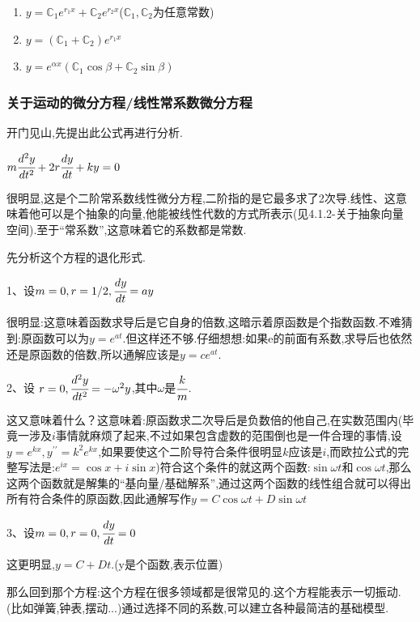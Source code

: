 \documentclass[UTF8,12pt]{ctexbook}
\newcommand{\doubleDerivative}{^{\prime\prime}}
\newcommand{\mathConstant}{\mathbb{C}}
\begin{document}
{{{{\begin{enumerate}
{          \begin{enumerate}
            \item $y = \mathConstant_1e^{r_1x} + \mathConstant_2e^{r_2x}$($\mathConstant_1,\mathConstant_2$为任意常数)
            \item $y = (\mathConstant_1 + \mathConstant_2)e^{r_1x}$
            \item $y = e^{\alpha x}(\mathConstant_1\cos\beta + \mathConstant_2\sin\beta)$
          \end{enumerate}
          }
  \end{enumerate}

}%

\subsubsection{关于运动的微分方程/线性常系数微分方程}{
开门见山,先提出此公式再进行分析.

$m\cfrac{d^2y}{dt^2} + 2r\cfrac{dy}{dt} + ky = 0$

很明显,这是个二阶常系数线性微分方程,二阶指的是它最多求了2次导.线性、这意味着他可以是个抽象的向量,他能被线性代数的方式所表示(见4.1.2-关于抽象向量空间).至于“常系数”,这意味着它的系数都是常数.

先分析这个方程的退化形式.

1、设$m = 0, r = 1/2, \cfrac{dy}{dt} = ay$

很明显:这意味着函数求导后是它自身的倍数,这暗示着原函数是个指数函数.不难猜到:原函数可以为$y = e^{at}$.但这样还不够.仔细想想:如果e的前面有系数,求导后也依然还是原函数的倍数,所以通解应该是$y = ce^{at}$.

2、设 $r = 0, \cfrac{d^2y}{dt^2} = -\omega^2y$,其中$\omega$是$\cfrac{k}{m}$.

这又意味着什么？这意味着:原函数求二次导后是负数倍的他自己,在实数范围内(毕竟一涉及$i$事情就麻烦了起来,不过如果包含虚数的范围倒也是一件合理的事情,设$y=e^{kx},y\doubleDerivative = k^{2}e^{kx}$,如果要使这个二阶导符合条件很明显$k$应该是$i$,而欧拉公式的完整写法是:$e^{ix} = \cos x + i\sin x$)符合这个条件的就这两个函数:$\sin\omega t$和$\cos\omega t$,那么这两个函数就是解集的“基向量/基础解系”,通过这两个函数的线性组合就可以得出所有符合条件的原函数,因此通解写作$y = C\cos\omega t + D\sin\omega t$

3、设$m = 0, r = 0, \cfrac{dy}{dt} = 0$

这更明显,$y = C + Dt$.(y是个函数,表示位置)

那么回到那个方程:这个方程在很多领域都是很常见的.这个方程能表示一切振动.(比如弹簧,钟表,摆动...)通过选择不同的系数,可以建立各种最简洁的基础模型.

}}}}
\end{document}

